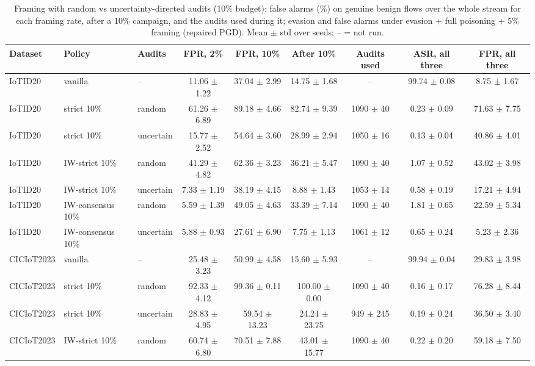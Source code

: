 \begin{table}[t]
\centering
\caption{Framing with random vs uncertainty-directed audits (10\% budget): false alarms (\%) on genuine benign flows over the whole stream for each framing rate, after a 10\% campaign, and the audits used during it; evasion and false alarms under evasion + full poisoning + 5\% framing (repaired PGD). Mean $\pm$ std over seeds; -- = not run.}
\label{tab:framing_audits}
\footnotesize
\setlength{\tabcolsep}{3pt}
\begin{tabular}{lllcccccc}
\toprule
Dataset & Policy & Audits & FPR, 2\% & FPR, 10\% & After 10\% & Audits used & ASR, all three & FPR, all three \\
\midrule
IoTID20 & vanilla & -- & 11.06 $\pm$ 1.22 & 37.04 $\pm$ 2.99 & 14.75 $\pm$ 1.68 & -- & 99.74 $\pm$ 0.08 & 8.75 $\pm$ 1.67 \\
IoTID20 & strict 10\% & random & 61.26 $\pm$ 6.89 & 89.18 $\pm$ 4.66 & 82.74 $\pm$ 9.39 & 1090 $\pm$ 40 & 0.23 $\pm$ 0.09 & 71.63 $\pm$ 7.75 \\
IoTID20 & strict 10\% & uncertain & 15.77 $\pm$ 2.52 & 54.64 $\pm$ 3.60 & 28.99 $\pm$ 2.94 & 1050 $\pm$ 16 & 0.13 $\pm$ 0.04 & 40.86 $\pm$ 4.01 \\
IoTID20 & IW-strict 10\% & random & 41.29 $\pm$ 4.82 & 62.36 $\pm$ 3.23 & 36.21 $\pm$ 5.47 & 1090 $\pm$ 40 & 1.07 $\pm$ 0.52 & 43.02 $\pm$ 3.98 \\
IoTID20 & IW-strict 10\% & uncertain & 7.33 $\pm$ 1.19 & 38.19 $\pm$ 4.15 & 8.88 $\pm$ 1.43 & 1053 $\pm$ 14 & 0.58 $\pm$ 0.19 & 17.21 $\pm$ 4.94 \\
IoTID20 & IW-consensus 10\% & random & 5.59 $\pm$ 1.39 & 49.05 $\pm$ 4.63 & 33.39 $\pm$ 7.14 & 1090 $\pm$ 40 & 1.81 $\pm$ 0.65 & 22.59 $\pm$ 5.34 \\
IoTID20 & IW-consensus 10\% & uncertain & 5.88 $\pm$ 0.93 & 27.61 $\pm$ 6.90 & 7.75 $\pm$ 1.13 & 1061 $\pm$ 12 & 0.65 $\pm$ 0.24 & 5.23 $\pm$ 2.36 \\
CICIoT2023 & vanilla & -- & 25.48 $\pm$ 3.23 & 50.99 $\pm$ 4.58 & 15.60 $\pm$ 5.93 & -- & 99.94 $\pm$ 0.04 & 29.83 $\pm$ 3.98 \\
CICIoT2023 & strict 10\% & random & 92.33 $\pm$ 4.12 & 99.36 $\pm$ 0.11 & 100.00 $\pm$ 0.00 & 1090 $\pm$ 40 & 0.16 $\pm$ 0.17 & 76.28 $\pm$ 8.44 \\
CICIoT2023 & strict 10\% & uncertain & 28.83 $\pm$ 4.95 & 59.54 $\pm$ 13.23 & 24.24 $\pm$ 23.75 & 949 $\pm$ 245 & 0.19 $\pm$ 0.24 & 36.50 $\pm$ 3.40 \\
CICIoT2023 & IW-strict 10\% & random & 60.74 $\pm$ 6.80 & 70.51 $\pm$ 7.88 & 43.01 $\pm$ 15.77 & 1090 $\pm$ 40 & 0.22 $\pm$ 0.20 & 59.18 $\pm$ 7.50 \\

\end{tabular}
\end{table}
